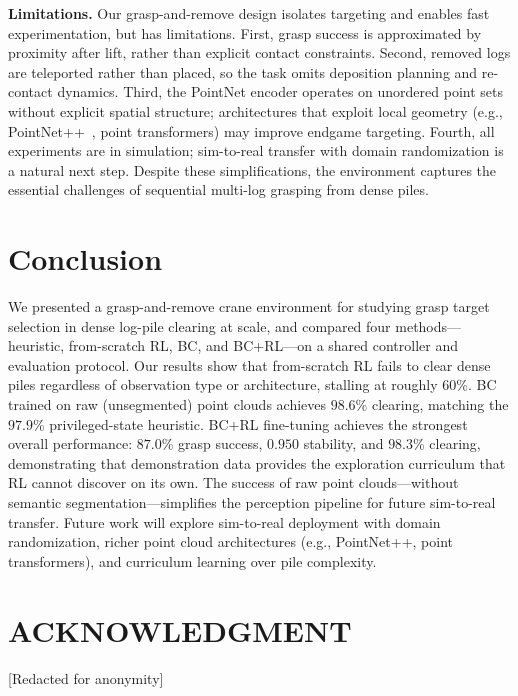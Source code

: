 \documentclass[conference]{IEEEtran}
\begin{document}
\textbf{Limitations.}
Our grasp-and-remove design isolates targeting and enables fast experimentation, but has limitations.
First, grasp success is approximated by proximity after lift, rather than explicit contact constraints.
Second, removed logs are teleported rather than placed, so the task omits deposition planning and re-contact dynamics.
Third, the PointNet encoder operates on unordered point sets without explicit spatial structure; architectures that exploit local geometry (e.g., PointNet++~\cite{qi2017pointnetplusplus}, point transformers) may improve endgame targeting.
Fourth, all experiments are in simulation; sim-to-real transfer with domain randomization is a natural next step.
Despite these simplifications, the environment captures the essential challenges of sequential multi-log grasping from dense piles.

\section{Conclusion}
We presented a grasp-and-remove crane environment for studying grasp target selection in dense log-pile clearing at scale, and compared four methods---heuristic, from-scratch RL, BC, and BC+RL---on a shared controller and evaluation protocol.
Our results show that from-scratch RL fails to clear dense piles regardless of observation type or architecture, stalling at roughly 60\%.
BC trained on raw (unsegmented) point clouds achieves $98.6$\% clearing, matching the $97.9$\% privileged-state heuristic.
BC+RL fine-tuning achieves the strongest overall performance: $87.0$\% grasp success, $0.950$ stability, and $98.3$\% clearing, demonstrating that demonstration data provides the exploration curriculum that RL cannot discover on its own.
The success of raw point clouds---without semantic segmentation---simplifies the perception pipeline for future sim-to-real transfer.
Future work will explore sim-to-real deployment with domain randomization, richer point cloud architectures (e.g., PointNet++, point transformers), and curriculum learning over pile complexity.

\section*{ACKNOWLEDGMENT}
[Redacted for anonymity]



\end{document}
